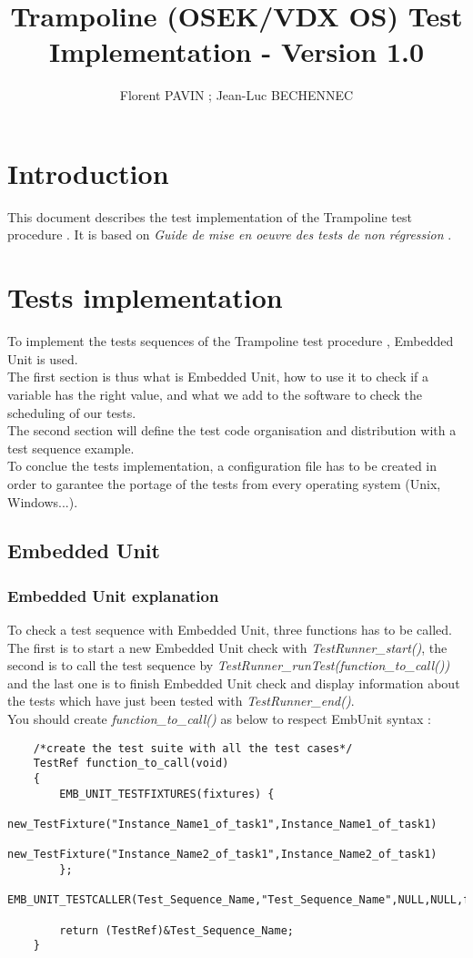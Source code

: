\documentclass[10pt]{article}
\title{Trampoline (OSEK/VDX OS) Test Implementation - Version 1.0}
\author{Florent PAVIN ; Jean-Luc BECHENNEC}
\begin{document}
\maketitle
\tableofcontents

\section{Introduction}
This document describes the test implementation of the Trampoline test procedure \cite{TrampolineTestPlan_10}. It is based on \textit{Guide de mise en oeuvre des tests de non régression} \cite{GuideDeMiseEnOeuvreDesTestsDeNonRegression}.

\section{Tests implementation}
To implement the tests sequences of the Trampoline test procedure \cite{TrampolineTestProcedure_10}, Embedded Unit \cite{Embunit} is used. \\ 
The first section is thus what is Embedded Unit, how to use it to check if a variable has the right value, and what we add to the software to check the scheduling of our tests. \\
The second section will define the test code organisation and distribution with a test sequence example.\\
To conclue the tests implementation, a configuration file has to be created in order to garantee the portage of the tests from every operating system (Unix, Windows...).

\subsection{Embedded Unit}

	\subsubsection{Embedded Unit explanation}
	To check a test sequence with Embedded Unit, three functions has to be called. The first is to start a new Embedded Unit check with \textit{TestRunner\_start()}, the second is to call the test sequence by \textit{TestRunner\_runTest(function\_to\_call())} and the last one is to finish Embedded Unit check and display information about the tests which have just been tested with \textit{TestRunner\_end()}.\\
	You should create \textit{function\_to\_call()} as below to respect EmbUnit syntax :
	\begin{lstlisting}
	/*create the test suite with all the test cases*/
	TestRef function_to_call(void)
	{
		EMB_UNIT_TESTFIXTURES(fixtures) {
			new_TestFixture("Instance_Name1_of_task1",Instance_Name1_of_task1)
			new_TestFixture("Instance_Name2_of_task1",Instance_Name2_of_task1)
		};
		EMB_UNIT_TESTCALLER(Test_Sequence_Name,"Test_Sequence_Name",NULL,NULL,fixtures);
	
		return (TestRef)&Test_Sequence_Name;
	}
	\end{lstlisting}
	
\end{document}
